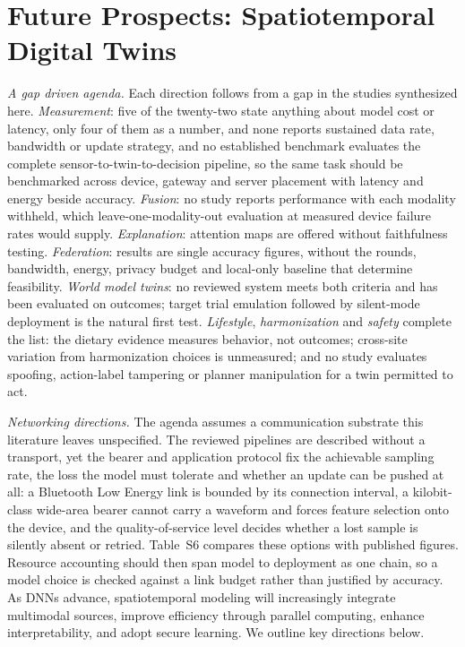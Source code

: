 \documentclass[journal]{IEEEtran}
\newif\ifsubmission
\begin{document}
\fi

\section{Future Prospects: Spatiotemporal Digital Twins}
\label{sec:future}
\ifsubmission
\emph{A gap driven agenda.} Each direction follows from a gap in the studies synthesized here. \emph{Measurement}: five of the twenty-two state anything about model cost or latency, only four of them as a number, and none reports sustained data rate, bandwidth or update strategy, and no established benchmark evaluates the complete sensor-to-twin-to-decision pipeline, so the same task should be benchmarked across device, gateway and server placement with latency and energy beside accuracy. \emph{Fusion}: no study reports performance with each modality withheld, which leave-one-modality-out evaluation at measured device failure rates would supply. \emph{Explanation}: attention maps are offered without faithfulness testing. \emph{Federation}: results are single accuracy figures, without the rounds, bandwidth, energy, privacy budget and local-only baseline that determine feasibility. \emph{World model twins}: no reviewed system meets both criteria and has been evaluated on outcomes; target trial emulation followed by silent-mode deployment is the natural first test. \emph{Lifestyle}, \emph{harmonization} and \emph{safety} complete the list: the dietary evidence measures behavior, not outcomes; cross-site variation from harmonization choices is unmeasured; and no study evaluates spoofing, action-label tampering or planner manipulation for a twin permitted to act.

\emph{Networking directions.} The agenda assumes a communication substrate this literature leaves unspecified. The reviewed pipelines are described without a transport, yet the bearer and application protocol fix the achievable sampling rate, the loss the model must tolerate and whether an update can be pushed at all: a Bluetooth Low Energy link is bounded by its connection interval, a kilobit-class wide-area bearer cannot carry a waveform and forces feature selection onto the device, and the quality-of-service level decides whether a lost sample is silently absent or retried. Table~S6 compares these options with published figures. Resource accounting should then span model to deployment as one chain, so a model choice is checked against a link budget rather than justified by accuracy.
\else
As DNNs advance, spatiotemporal modeling will increasingly integrate multimodal sources, improve efficiency through parallel computing, enhance interpretability, and adopt secure learning. We outline key directions below.
\end{document}
